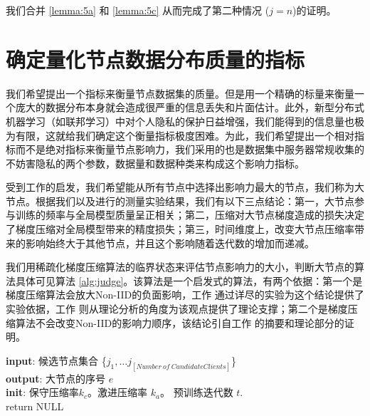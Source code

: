 我们合并 \ref{lemma:5a} 和 \ref{lemma:5c} 从而完成了第二种情况 ($j=n$)的证明。


\section{确定量化节点数据分布质量的指标}

我们希望提出一个指标来衡量节点数据集的质量。但是用一个精确的标量来衡量一个庞大的数据分布本身就会造成很严重的信息丢失和片面估计。此外，新型分布式机器学习（如联邦学习）中对个人隐私的保护日益增强，我们能得到的信息量也极为有限，这就给我们确定这个衡量指标极度困难。为此，我们希望提出一个相对指标而不是绝对指标来衡量节点影响力，我们采用的也是数据集中服务器常规收集的不妨害隐私的两个参数，数据量和数据种类来构成这个影响力指标。

受到工作\cite{accordion}的启发，我们希望能从所有节点中选择出影响力最大的节点，我们称为大节点。根据我们以及进行的测量实验结果，我们有以下三点结论：第一，大节点参与训练的频率与全局模型质量呈正相关；第二，压缩对大节点梯度造成的损失决定了梯度压缩对全局模型带来的精度损失；第三，时间维度上，改变大节点压缩率带来的影响始终大于其他节点，并且这个影响随着迭代数的增加而递减。



我们用稀疏化梯度压缩算法的临界状态来评估节点影响力的大小，判断大节点的算法具体可见算法 \ref{alg:judge}。该算法是一个启发式的算法，有两个依据：第一个是梯度压缩算法会放大Non-IID的负面影响，工作 \cite{niid2020icml}通过详尽的实验为这个结论提供了实验依据，工作 \cite{stich2020communication}则从理论分析的角度为该观点提供了理论支撑；第二个是梯度压缩算法不会改变Non-IID的影响力顺序，该结论引自工作 \cite{CFedAVG}的摘要和理论部分的证明。

\begin{algorithm}
\caption{判定大节点 }
\label{alg:judge}
\SetAlgoLined
\textbf{input}: 候选节点集合 \{$j_1,\ldots j_{[Number\ of\ Candidate Clients]}$\}\\
\textbf{output}: 大节点的序号 $e$\\
\textbf{init}: 保守压缩率$k_c$。激进压缩率 $k_a$。
预训练迭代数 $t$.\\
return NULL\\
\end{algorithm}

